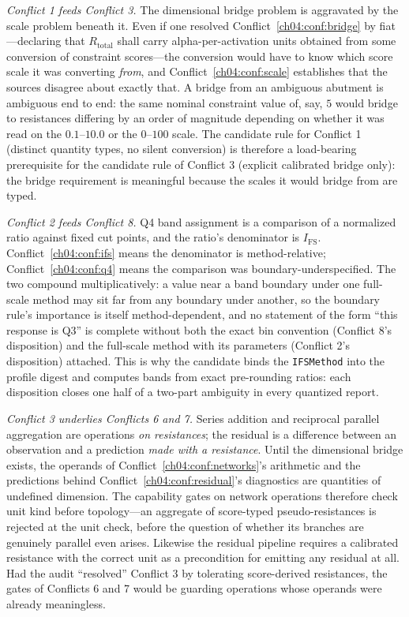 \emph{Conflict 1 feeds Conflict 3.} The dimensional bridge problem is
aggravated by the scale problem beneath it. Even if one resolved
Conflict~\ref{ch04:conf:bridge} by fiat---declaring that $R_{\mathrm{total}}$
shall carry alpha-per-activation units obtained from some conversion of
constraint scores---the conversion would have to know which score scale it
was converting \emph{from}, and Conflict~\ref{ch04:conf:scale} establishes
that the sources disagree about exactly that. A bridge from an ambiguous
abutment is ambiguous end to end: the same nominal constraint value of, say,
$5$ would bridge to resistances differing by an order of magnitude depending
on whether it was read on the $0.1$--$10.0$ or the $0$--$100$ scale. The
candidate rule for Conflict 1 (distinct quantity types, no silent
conversion) is therefore a load-bearing prerequisite for the candidate rule
of Conflict 3 (explicit calibrated bridge only): the bridge requirement is
meaningful because the scales it would bridge from are typed.

\emph{Conflict 2 feeds Conflict 8.} Q4 band assignment is a comparison of a
normalized ratio against fixed cut points, and the ratio's denominator is
$I_{\mathrm{FS}}$. Conflict~\ref{ch04:conf:ifs} means the denominator is
method-relative; Conflict~\ref{ch04:conf:q4} means the comparison was
boundary-underspecified. The two compound multiplicatively: a value near a
band boundary under one full-scale method may sit far from any boundary
under another, so the boundary rule's importance is itself method-dependent,
and no statement of the form ``this response is Q3'' is complete without
both the exact bin convention (Conflict 8's disposition) and the full-scale
method with its parameters (Conflict 2's disposition) attached. This is why
the candidate binds the \texttt{IFSMethod} into the profile digest and
computes bands from exact pre-rounding ratios: each disposition closes one
half of a two-part ambiguity in every quantized report.

\emph{Conflict 3 underlies Conflicts 6 and 7.} Series addition and
reciprocal parallel aggregation are operations \emph{on resistances}; the
residual is a difference between an observation and a prediction \emph{made
with a resistance}. Until the dimensional bridge exists, the operands of
Conflict~\ref{ch04:conf:networks}'s arithmetic and the predictions behind
Conflict~\ref{ch04:conf:residual}'s diagnostics are quantities of undefined
dimension. The capability gates on network operations therefore check unit
kind before topology---an aggregate of score-typed pseudo-resistances is
rejected at the unit check, before the question of whether its branches are
genuinely parallel even arises. Likewise the residual pipeline requires a
calibrated resistance with the correct unit as a precondition for emitting
any residual at all. Had the audit ``resolved'' Conflict 3 by tolerating
score-derived resistances, the gates of Conflicts 6 and 7 would be guarding
operations whose operands were already meaningless.

